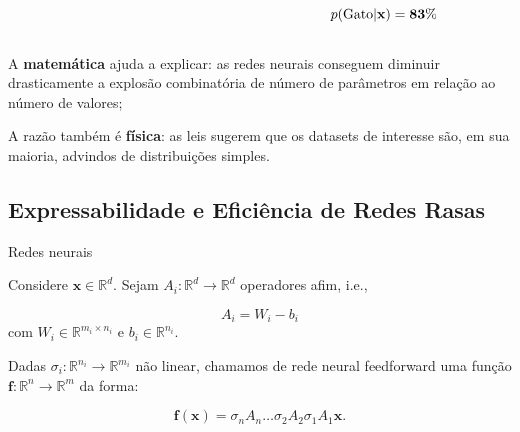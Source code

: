 \documentclass{beamer}
\begin{document}
\begin{frame}
\begin{columns}
\begin{column}{0.3\textwidth}
\begin{figure}
            \end{figure}
        \end{column}
        \begin{column}{0.3\textwidth}
            \[
                p(\text{Gato} |\bf{x}) = 83\%
            \]
        \end{column}
    \end{columns}
    
    \vspace{1em}

    \pause

    A \textbf{matemática} ajuda a explicar: as redes neurais conseguem diminuir drasticamente a explosão combinatória de número de parâmetros em relação ao número de valores;
    \vspace{1em}
    
    \pause

    A razão também é \textbf{física}: as leis sugerem que os datasets de interesse são, em sua maioria, advindos de distribuições simples.

\end{frame}


\subsection{Expressabilidade e Eficiência de Redes Rasas}
\begin{frame}
    \tableofcontents[currentsection]
\end{frame}

\begin{frame}{Redes neurais}

    Considere $\mathbf x \in \mathbb R^d$. Sejam $A_i:\mathbb R^d \to \mathbb R^d$ operadores afim, i.e.,

    \[
        A_i = W_i - b_i
    \]
    com $W_i \in \mathbb R^{m_i \times n_i}$ e $b_i \in \mathbb R^{n_i}$.

    \vspace{1em}

    \pause 

    Dadas $\sigma_i:\mathbb R^{n_i} \to \mathbb R^{m_i}$ não linear, chamamos de rede neural feedforward uma função $\mathbf f: \mathbb R^n \to \mathbb R^m$ da forma:

    \begin{equation}
        \mathbf f (\mathbf x) = \sigma_n A_n \dots \sigma_2 A_2 \sigma_1 A_1 \mathbf x.
    \end{equation}

\end{frame}
\end{document}
